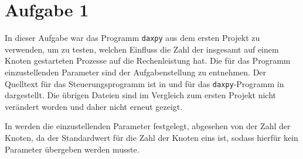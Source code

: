 \section*{Aufgabe 1}
In dieser Aufgabe war das Programm \texttt{daxpy} aus dem ersten Projekt zu verwenden,
um zu testen, welchen Einfluss die Zahl der insgesamt auf einem Knoten gestarteten
Prozesse auf die Rechenleistung hat. Die für das Programm einzustellenden Parameter
sind der Aufgabenstellung zu entnehmen. Der Quelltext für das Steuerungsprogramm
ist in  und für das \texttt{daxpy}-Programm in  dargestellt.
Die übrigen Dateien sind im Vergleich zum ersten Projekt nicht verändert worden
und daher nicht erneut gezeigt.




In  werden die einzustellenden Parameter festgelegt, abgesehen von
der Zahl der Knoten, da der Standardwert für die Zahl der Knoten eins ist, sodass
hierfür kein Parameter übergeben werden musste.

